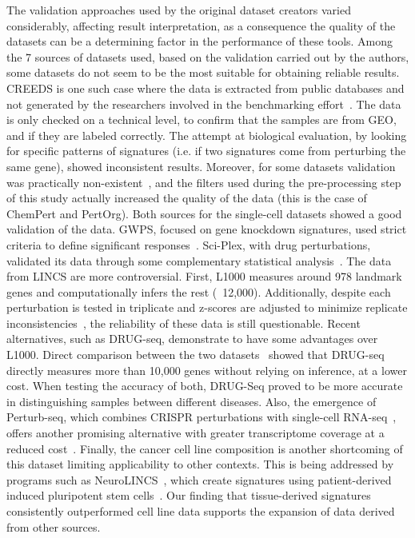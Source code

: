 The validation approaches used by the original dataset creators varied considerably, affecting result interpretation, as a consequence the quality of the datasets can be a determining factor in the performance of these tools. Among the 7 sources of datasets used, based on the validation carried out by the authors, some datasets do not seem to be the most suitable for obtaining reliable results. 
CREEDS is one such case where the data is extracted from public databases and not generated by the researchers involved in the benchmarking effort~\cite{RN87}. The data is only checked on a technical level, to confirm that the samples are from GEO, and if they are labeled correctly. The attempt at biological evaluation, by looking for specific patterns of signatures (i.e. if two signatures come from perturbing the same gene), showed inconsistent results. Moreover, for some datasets validation was practically non-existent~\cite{RN85, RN86}, and the filters used during the pre-processing step of this study actually increased the quality of the data (this is the case of ChemPert and PertOrg). Both sources for the single-cell datasets showed a good validation of the data. GWPS, focused on gene knockdown signatures, used strict criteria to define significant responses~\cite{RN89}. Sci-Plex, with drug perturbations, validated its data through some complementary statistical analysis~\cite{RN88}. The data from LINCS are more controversial. First, L1000 measures around 978 landmark genes and computationally infers the rest (~12,000). Additionally, despite each perturbation is tested in triplicate and z-scores are adjusted to minimize replicate inconsistencies~\cite{RN30}, the reliability of these data is still questionable. Recent alternatives, such as DRUG-seq, demonstrate to have some advantages over L1000. Direct comparison between the two datasets~\cite{RN130, RN105} showed that DRUG-seq directly measures more than 10,000 genes without relying on inference, at a lower cost. When testing the accuracy of both, DRUG-Seq proved to be more accurate in distinguishing samples between different diseases. Also, the emergence of Perturb-seq, which combines CRISPR perturbations with single-cell RNA-seq~\cite{RN89}, offers another promising alternative with greater transcriptome coverage at a reduced cost~\cite{RN165}. Finally, the cancer cell line composition is another shortcoming of this dataset limiting applicability to other contexts. This is being addressed by programs such as NeuroLINCS~\cite{RN164}, which create signatures using patient-derived induced pluripotent stem cells~\cite{RN165}. Our finding that tissue-derived signatures consistently outperformed cell line data supports the expansion of data derived from other sources.


